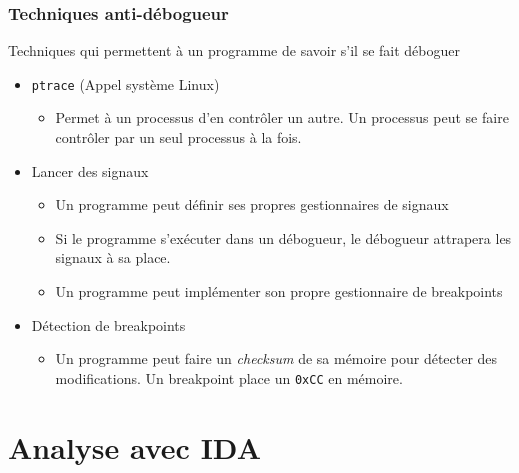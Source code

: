\documentclass[10pt,xcolor={table,dvipsnames},t]{beamer}
\begin{document}
\begin{frame}
    \frametitle{Techniques anti-débogueur}
    Techniques qui permettent à un programme de savoir s'il se fait déboguer
    
    \begin{itemize}
        \item \texttt{ptrace} (Appel système Linux)
        \begin{itemize}
            \item Permet à un processus d'en contrôler un autre. Un processus peut se faire contrôler par un seul processus à la fois.
        \end{itemize}
        
        \item Lancer des signaux
        \begin{itemize}
            \item Un programme peut définir ses propres gestionnaires de signaux
            \item Si le programme s'exécuter dans un débogueur, le débogueur attrapera les signaux à sa place.
            \item Un programme peut implémenter son propre gestionnaire de breakpoints
        \end{itemize}
        
        \item Détection de breakpoints
        \begin{itemize}
            \item Un programme peut faire un \textit{checksum} de sa mémoire pour détecter des modifications. Un breakpoint place un \texttt{0xCC} en mémoire.
        \end{itemize}
        
    \end{itemize}
\end{frame}



\section{Analyse avec IDA}
\end{document}
